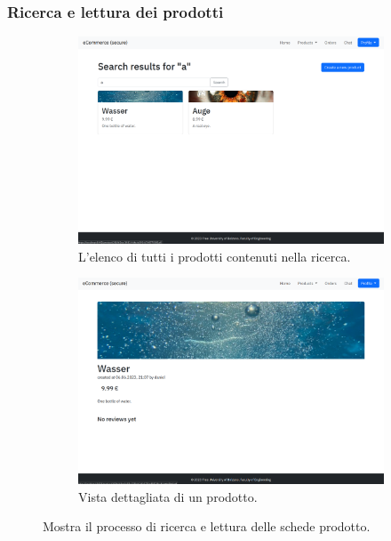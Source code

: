 \documentclass[conference,onecolumn,a4paper]{IEEEtran}
\begin{document}
{\subsubsection{Ricerca e lettura dei prodotti}

\begin{figure}[H]
    \centering
    \begin{subfigure}[b]{0.4\linewidth}
        \includegraphics[width=\linewidth]{resources/seach-product.png}
        \caption{L'elenco di tutti i prodotti contenuti nella ricerca.}
    \end{subfigure}
    \begin{subfigure}[b]{0.4\linewidth}
        \includegraphics[width=\linewidth]{resources/product.png}
        \caption{Vista dettagliata di un prodotto.}
    \end{subfigure}
    \caption{Mostra il processo di ricerca e lettura delle schede prodotto.}
\end{figure}

}
\end{document}
